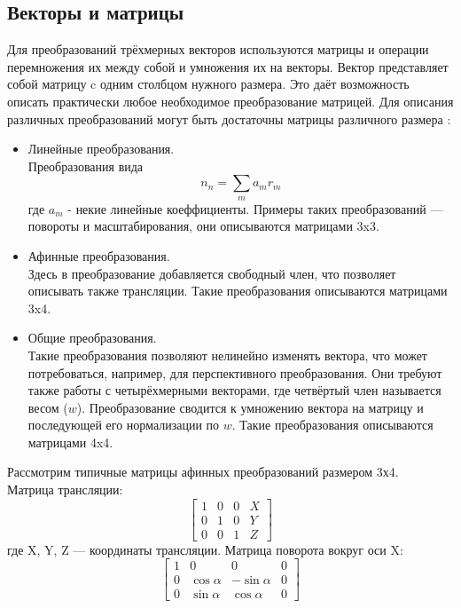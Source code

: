 \documentclass[a4paper,12pt]{report}
\numberwithin{equation}{section}
\begin{document}
\subsection{Векторы и матрицы} \label{matrix_section}
Для преобразований трёхмерных векторов используются матрицы и операции перемножения их между собой и умножения их на векторы. Вектор представляет собой матрицу c одним столбцом нужного размера. Это даёт возможность описать практически любое необходимое преобразование матрицей. Для описания различных преобразований могут быть достаточны матрицы различного размера \cite{eigenmanual}:
\begin{itemize}
\item Линейные преобразования. \\
Преобразования вида
\begin{equation*}
n_n = \sum_{m} a_m r_m
\end{equation*}
где $a_m$ - некие линейные коеффициенты. Примеры таких преобразований --- повороты и масштабирования, они описываются матрицами 3x3.
\item Афинные преобразования. \\
Здесь в преобразование добавляется свободный член, что позволяет описывать также трансляции. Такие преобразования описываются матрицами 3x4.
\item Общие преобразования. \\
Такие преобразования позволяют нелинейно изменять вектора, что может потребоваться, например, для перспективного преобразования. Они требуют также работы с четырёхмерными векторами, где четвёртый член называется весом ($w$). Преобразование сводится к умножению вектора на матрицу и последующей его нормализации по $w$. Такие преобразования описываются матрицами 4x4.
\end{itemize}
Рассмотрим типичные матрицы афинных преобразований размером 3х4. \cite{wiki:rasterization} \\
Матрица трансляции:
\begin{equation}
\begin{bmatrix}
1 & 0 & 0 & X \\
0 & 1 & 0 & Y \\
0 & 0 & 1 & Z
\end{bmatrix}
\end{equation}
где X, Y, Z --- координаты трансляции.
Матрица поворота вокруг оси X:
\begin{equation}
\begin{bmatrix}
1 & 0 & 0 & 0 \\
0 & \cos{\alpha} & -\sin{\alpha} & 0 \\
0 & \sin{\alpha} & \cos{\alpha} & 0
\end{bmatrix}
\end{equation}
\end{document}
